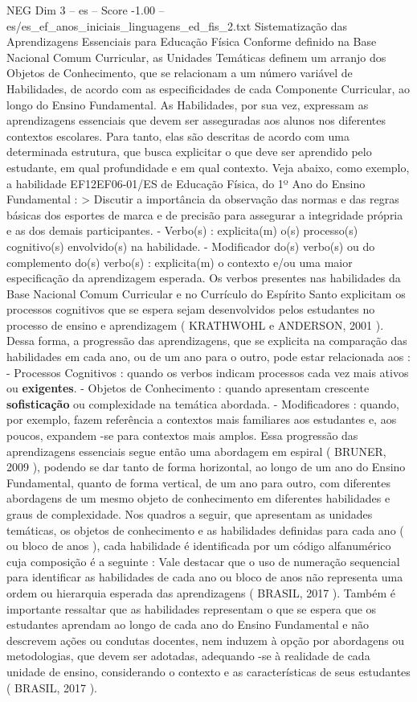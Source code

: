 \begin{textsample}{NEG Dim 3 – es – Score -1.00 – es/es\_ef\_anos\_iniciais\_linguagens\_ed\_fis\_2.txt}  \label{ex:f3_neg_177}
Sistematização das Aprendizagens Essenciais para Educação Física Conforme definido na Base Nacional Comum Curricular, as Unidades Temáticas definem um arranjo dos Objetos de Conhecimento, que se relacionam a um número variável de Habilidades, de acordo com as especificidades de cada Componente Curricular, ao longo do Ensino Fundamental.
As Habilidades, por sua vez, expressam as aprendizagens essenciais que devem ser asseguradas aos alunos nos diferentes contextos escolares.
Para tanto, elas são descritas de acordo com uma determinada estrutura, que busca explicitar o que deve ser aprendido pelo estudante, em qual profundidade e em qual contexto.
Veja abaixo, como exemplo, a habilidade EF12EF06-01/ES de Educação Física, do 1º Ano do Ensino Fundamental : > Discutir a importância da observação das normas e das regras básicas dos esportes de marca e de precisão para assegurar a integridade própria e as dos demais participantes. - Verbo(s) : explicita(m) o(s) processo(s) cognitivo(s) envolvido(s) na habilidade. - Modificador do(s) verbo(s) ou do complemento do(s) verbo(s) : explicita(m) o contexto e/ou uma maior especificação da aprendizagem esperada.
Os verbos presentes nas habilidades da Base Nacional Comum Curricular e no Currículo do Espírito Santo explicitam os processos cognitivos que se espera sejam desenvolvidos pelos estudantes no processo de ensino e aprendizagem ( KRATHWOHL e ANDERSON, 2001 ).
Dessa forma, a progressão das aprendizagens, que se explicita na comparação das habilidades em cada ano, ou de um ano para o outro, pode estar relacionada aos : - Processos Cognitivos : quando os verbos indicam processos cada vez mais ativos ou \textbf{exigentes}. - Objetos de Conhecimento : quando apresentam crescente \textbf{sofisticação} ou complexidade na temática abordada. - Modificadores : quando, por exemplo, fazem referência a contextos mais familiares aos estudantes e, aos poucos, expandem -se para contextos mais amplos.
Essa progressão das aprendizagens essenciais segue então uma abordagem em espiral ( BRUNER, 2009 ), podendo se dar tanto de forma horizontal, ao longo de um ano do Ensino Fundamental, quanto de forma vertical, de um ano para outro, com diferentes abordagens de um mesmo objeto de conhecimento em diferentes habilidades e graus de complexidade.
Nos quadros a seguir, que apresentam as unidades temáticas, os objetos de conhecimento e as habilidades definidas para cada ano ( ou bloco de anos ), cada habilidade é identificada por um código alfanumérico cuja composição é a seguinte : Vale destacar que o uso de numeração sequencial para identificar as habilidades de cada ano ou bloco de anos não representa uma ordem ou hierarquia esperada das aprendizagens ( BRASIL, 2017 ).
Também é importante ressaltar que as habilidades representam o que se espera que os estudantes aprendam ao longo de cada ano do Ensino Fundamental e não descrevem ações ou condutas docentes, nem induzem à opção por abordagens ou metodologias, que devem ser adotadas, adequando -se à realidade de cada unidade de ensino, considerando o contexto e as características de seus estudantes ( BRASIL, 2017 ).

\end{textsample}
